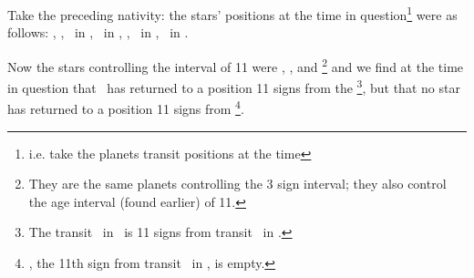 Take the preceding nativity: the stars’ positions at the time in question\footnote{i.e. take the planets transit positions at the time} were as follows: \Sun, \Jupiter, \Mercury\, in \Gemini, \Saturn\, in \Virgo, \Mars, \Venus\, in \Taurus, \Moon\, in \Pisces. 

\noindent Now the stars controlling the interval of 11 were \Saturn, \Jupiter, and \Venus\footnote{They are the same planets controlling the 3 sign interval; they also control the age interval (found earlier) of 11.} and we find at the time in question that \Venus\, has returned to a position 11 signs from the \Moon\footnote{The transit \Moon\, in \Pisces\, is 11 signs from transit \Venus\, in \Taurus.}, but that no star has returned to a position 11 signs from \Jupiter\footnote{\Aries, the 11th sign from transit \Jupiter\, in \Gemini, is empty.}. 

